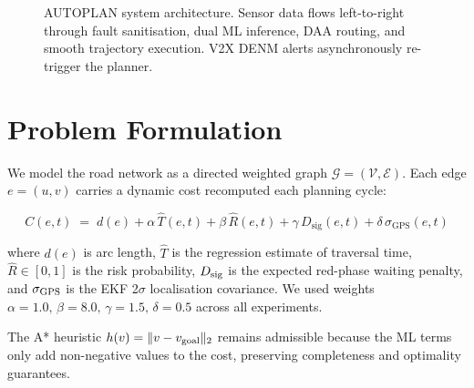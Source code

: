 \documentclass[conference]{IEEEtran}
\begin{document}
\begin{figure}[t]
{
}
\caption{AUTOPLAN system architecture. Sensor data flows left-to-right
through fault sanitisation, dual ML inference, DAA routing, and smooth
trajectory execution. V2X DENM alerts asynchronously re-trigger the
planner.}
\label{fig:flowchart}
\end{figure}

\section{Problem Formulation}
\label{sec:method}

We model the road network as a directed weighted graph
$\mathcal{G} = (\mathcal{V}, \mathcal{E})$. Each edge $e = (u,v)$ carries
a dynamic cost recomputed each planning cycle:

\begin{equation}
C(e,t) \;=\; d(e)
         + \alpha\,\hat{T}(e,t)
         + \beta\,\hat{R}(e,t)
         + \gamma\,D_{\mathrm{sig}}(e,t)
         + \delta\,\sigma_{\mathrm{GPS}}(e,t)
\label{eq:cost}
\end{equation}

\noindent where $d(e)$ is arc length, $\hat{T}$ is the regression estimate
of traversal time, $\hat{R}\in[0,1]$ is the risk probability, $D_{\rm sig}$
is the expected red-phase waiting penalty, and $\sigma_{\rm GPS}$ is the EKF
2$\sigma$ localisation covariance. We used weights
$\alpha\!=\!1.0,\,\beta\!=\!8.0,\,\gamma\!=\!1.5,\,\delta\!=\!0.5$
across all experiments.

The A* heuristic $h(v) = \|v - v_{\rm goal}\|_2$ remains admissible because
the ML terms only add non-negative values to the cost, preserving
completeness and optimality guarantees.
\end{document}
